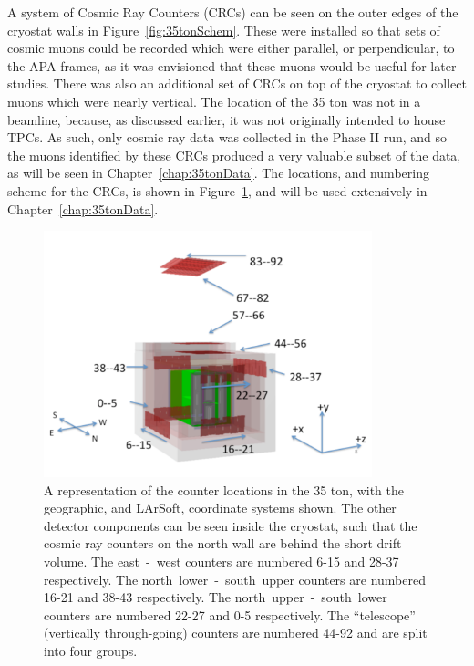 A system of Cosmic Ray Counters (CRCs) can be seen on the outer edges of the cryostat walls in Figure~\ref{fig:35tonSchem}. These were installed so that sets of cosmic muons could be recorded which were either parallel, or perpendicular, to the APA frames, as it was envisioned that these muons would be useful for later studies. There was also an additional set of CRCs on top of the cryostat to collect muons which were nearly vertical. The location of the 35 ton was not in a beamline, because, as discussed earlier, it was not originally intended to house TPCs. As such, only cosmic ray data was collected in the Phase II run, and so the muons identified by these CRCs produced a very valuable subset of the data, as will be seen in Chapter~\ref{chap:35tonData}. The locations, and numbering scheme for the CRCs, is shown in Figure~\ref{fig:35tonCounterLoc}, and will be used extensively in Chapter~\ref{chap:35tonData}. \\

\begin{figure}
  \centering
  \includegraphics[width=0.85\textwidth]{35tonFullDetect}
  \caption[A representation of the counter locations in the 35 ton]
          {A representation of the counter locations in the 35 ton, with the geographic, and LArSoft, coordinate systems shown. The other detector components can be seen inside the cryostat, such that the cosmic ray counters on the north wall are behind the short drift volume. The east~-~west counters are numbered 6-15 and 28-37 respectively. The north~lower~-~south~upper counters are numbered 16-21 and 38-43 respectively. The north~upper~-~south~lower counters are numbered 22-27 and 0-5 respectively. The ``telescope'' (vertically through-going) counters are numbered 44-92 and are split into four groups.}
  \label{fig:35tonCounterLoc}
\end{figure}

